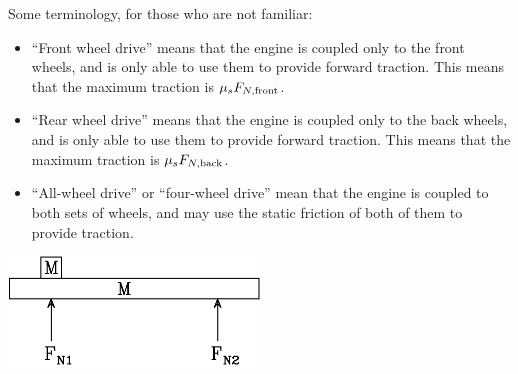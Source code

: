\documentclass[12pt]{article}
\newcommand{\BI}{\begin{itemize}}
\newcommand{\EI}{\end{itemize}}
\begin{document}
Some terminology, for those who are not familiar:

\BI
\item ``Front wheel drive'' means that the engine is coupled only to the front wheels, and is only able to use 
them to provide forward traction. This means that the maximum traction is $\mu_s F_{N, \rm front}$.
\item ``Rear wheel drive'' means that the engine is coupled only to the back wheels, and is only able to use 
them to provide forward traction. This means that the maximum traction is $\mu_s F_{N, \rm back}$.
\item ``All-wheel drive'' or ``four-wheel drive'' mean that the engine is coupled to both sets of wheels,
and may use the static friction of both of them to provide traction.
\EI

\begin{center}\includegraphics[width=0.5\textwidth]{car-crop.pdf}\end{center}
\end{document}

